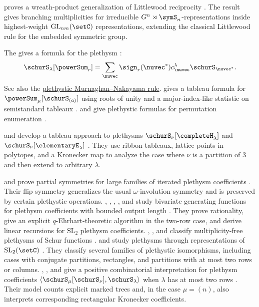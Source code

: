  proves a wreath-product
generalization of Littlewood reciprocity \cite{Weising2025Littlewoodx}.
The result gives branching multiplicities for irreducible
$G^n\rtimes \symS_n$-representations inside highest-weight
$\mathrm{GL}_{nm}(\setC)$ representations, extending the classical
Littlewood rule for the embedded symmetric group.

The \label{sxpRule} gives a formula for the plethysm
\cite{Wildon2018}:
\[
\schurS_\lambda[\powerSum_r] = \sum_{\nuvec} \sign_r(\nuvec^\ast) c^{\lambda}_{\nuvec} \schurS_{\nuvec^\ast}.
\]
See also the \hyperref[plethysticMNRule]{plethystic Murnaghan--Nakayama rule}.
 gives a tableau formula for
$\powerSum_\mu[\schurS_{(a)}]$ using roots of unity and a major-index-like
statistic on semistandard tableaux \cite{Doran1998}.
 and  give plethystic formulas for
permutation enumeration \cite{GesselZhuang2020}.

 and
 develop a tableau approach to plethysms
$\schurS_\nu[\completeH_\lambda]$ and $\schurS_\nu[\elementaryE_\lambda]$
\cite{MaasGariepyTetreault2022x}.  They use ribbon tableaux, lattice points
in polytopes, and a Kronecker map to analyze the case where $\nu$ is a
partition of $3$ and then extend to arbitrary $\lambda$.

 and  prove partial symmetries
for large families of iterated plethysm coefficients
\cite{GutierrezRosas2023}.  Their flip symmetry generalizes the usual
$\omega$-involution symmetry and is preserved by certain plethystic
operations.
, , ,
, and  study bivariate generating
functions for plethysm coefficients with bounded output length
\cite{GutierrezOrellanaSaliolaSchillingZabrocki2025x}.  They prove
rationality, give an explicit $q$-Ehrhart-theoretic algorithm in the
two-row case, and derive linear recursions for $\mathrm{SL}_2$ plethysm
coefficients.
, , and 
classify multiplicity-free plethysms of Schur functions
\cite{BessenrodtBowmanPaget2022}.
 and  study plethysms through
representations of $\mathrm{SL}_2(\setC)$ \cite{PagetWildon2021}.  They
classify several families of plethystic isomorphisms, including cases with
conjugate partitions, rectangles, and partitions with at most two rows or
columns.
, , and  give a
positive combinatorial interpretation for plethysm coefficients
$\langle \schurS_\mu[\schurS_\nu],\schurS_\lambda\rangle$ when $\lambda$ has
at most two rows \cite{PakPanovaSwanson2025x}.  Their model counts explicit
marked trees and, in the case $\mu=(n)$, also interprets corresponding
rectangular Kronecker coefficients.



